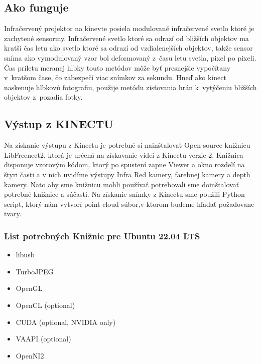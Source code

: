 \subsection{Ako funguje}
Infračervený projektor na kinevte posiela modulované infračervené svetlo ktoré je zachytené sensormy. Infračervené svetlo ktoré sa odrazí od bližších objektov ma kratší čas letu ako svetlo ktoré sa odrazí od vzdialenejších objektov, takže sensor sníma ako vymodulovaný vzor bol deformovaný z času letu svetla, pixel po pixeli. Čas príletu meranej hlbky touto metódov môže byť presnejšie vypočítany v kratšom čase, čo zabezpečí viac snímkov za sekundu. Hneď ako kinect naskenuje hlbkovú fotografiu, použije metódu zisťovania hrán k vytýčeniu bližších objektov z pozadia fotky. 
\subsection{Výstup z KINECTU}
Na získanie výstupu z Kinectu je potrebné si nainštalovať Open-source knižnicu LibFreenect2, ktorá je určená na získavanie videi z Kinectu verzie 2. Knižnica disponuje vzorovým kódom, ktorý po spustení zapne Viewer a okno rozdelí na štyri časti a v nich uvidíme výstupy Infra Red kamery, farebnej kamery a depth kamery. Nato aby sme knižnicu mohli používať potrebovali sme doinštalovať potrebné knižnice a súčasti. Na získanie snímky z Kinectu sme použili Python script, ktorý nám vytvorí point cloud súbor,v ktorom budeme hľadať požadovane tvary. 
\subsubsection{List potrebných Knižnic pre Ubuntu 22.04 LTS}
\begin{itemize}
    \item libusb 
    \item TurboJPEG
    \item OpenGL
    \item OpenCL (optional) 
    \item CUDA (optional, NVIDIA only)
    \item VAAPI (optional)
    \item OpenNI2
\end{itemize}
